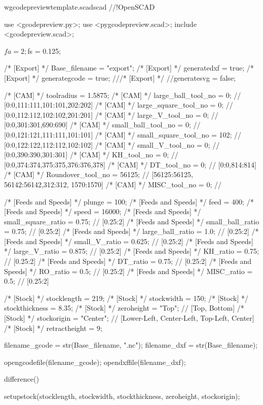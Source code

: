 \documentclass{ltxdoc}
\begin{document}
\lstset{firstnumber=1}%
\begin{writecode}{w}{gcodepreviewtemplate.scad}{scad}
//!OpenSCAD

use <gcodepreview.py>;
use <pygcodepreview.scad>;
include <gcodepreview.scad>;

$fa = 2;
$fs = 0.125;

/* [Export] */
Base_filename = "export"; 
/* [Export] */
generatedxf = true; 
/* [Export] */
generategcode = true; 
///* [Export] */
//generatesvg = false; 

/* [CAM] */
toolradius = 1.5875;
/* [CAM] */
large_ball_tool_no = 0; // [0:0,111:111,101:101,202:202]
/* [CAM] */
large_square_tool_no = 0; // [0:0,112:112,102:102,201:201]
/* [CAM] */
large_V_tool_no = 0; // [0:0,301:301,690:690]
/* [CAM] */
small_ball_tool_no = 0; // [0:0,121:121,111:111,101:101]
/* [CAM] */
small_square_tool_no = 102; // [0:0,122:122,112:112,102:102]
/* [CAM] */
small_V_tool_no = 0; // [0:0,390:390,301:301]
/* [CAM] */
KH_tool_no = 0; // [0:0,374:374,375:375,376:376,378]
/* [CAM] */
DT_tool_no = 0; // [0:0,814:814]
/* [CAM] */
Roundover_tool_no = 56125; // [56125:56125, 56142:56142,312:312, 1570:1570]
/* [CAM] */
MISC_tool_no = 0; // 

/* [Feeds and Speeds] */
plunge = 100;
/* [Feeds and Speeds] */
feed = 400;
/* [Feeds and Speeds] */
speed = 16000;
/* [Feeds and Speeds] */
small_square_ratio = 0.75; // [0.25:2]
/* [Feeds and Speeds] */
small_ball_ratio = 0.75; // [0.25:2]
/* [Feeds and Speeds] */
large_ball_ratio = 1.0; // [0.25:2]
/* [Feeds and Speeds] */
small_V_ratio = 0.625; // [0.25:2]
/* [Feeds and Speeds] */
large_V_ratio = 0.875; // [0.25:2]
/* [Feeds and Speeds] */
KH_ratio = 0.75; // [0.25:2]
/* [Feeds and Speeds] */
DT_ratio = 0.75; // [0.25:2]
/* [Feeds and Speeds] */
RO_ratio = 0.5; // [0.25:2]
/* [Feeds and Speeds] */
MISC_ratio = 0.5; // [0.25:2]

/* [Stock] */
stocklength = 219;
/* [Stock] */
stockwidth = 150;
/* [Stock] */
stockthickness = 8.35;
/* [Stock] */
zeroheight = "Top"; // [Top, Bottom]
/* [Stock] */
stockorigin = "Center"; // [Lower-Left, Center-Left, Top-Left, Center]
/* [Stock] */
retractheight = 9;

filename_gcode = str(Base_filename, ".nc");
filename_dxf = str(Base_filename);

opengcodefile(filename_gcode);
opendxffile(filename_dxf);

difference() {
setupstock(stocklength, stockwidth, stockthickness, zeroheight, stockorigin);

}
\end{writecode}
\end{document}

